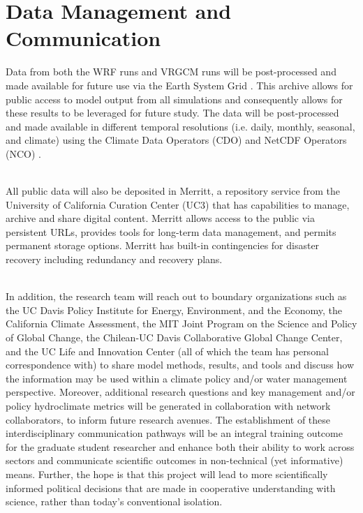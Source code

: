 \documentclass[11pt]{article}
\begin{document}
\setcounter{section}{1}

\section{Data Management and Communication}

Data from both the WRF runs and VRGCM runs will be post-processed and made available for future use via the Earth System Grid \citep{williams2009earth}. This archive allows for public access to model output from all simulations and consequently allows for these results to be leveraged for future study.  The data will be post-processed and made available in different temporal resolutions (i.e. daily, monthly, seasonal, and climate) using the Climate Data Operators (CDO) and NetCDF Operators (NCO) \citep{schulzweida2007cdo,zender2006netcdf}.

\ \\

\noindent All public data will also be deposited in Merritt, a repository service from the University of California Curation Center (UC3) that has capabilities to manage, archive and share digital content. Merritt allows access to the public via persistent URLs, provides tools for long-term data management, and permits permanent storage options. Merritt has built-in contingencies for disaster recovery including redundancy and recovery plans.

\ \\

\noindent In addition, the research team will reach out to boundary organizations such as the UC Davis Policy Institute for Energy, Environment, and the Economy, the California Climate Assessment, the MIT Joint Program on the Science and Policy of Global Change, the Chilean-UC Davis Collaborative Global Change Center, and the UC Life and Innovation Center (all of which the team has personal correspondence with) to share model methods, results, and tools and discuss how the information may be used within a climate policy and/or water management perspective.  Moreover, additional research questions and key management and/or policy hydroclimate metrics will be generated in collaboration with network collaborators, to inform future research avenues.  The establishment of these interdisciplinary communication pathways will be an integral training outcome for the graduate student researcher and enhance both their ability to work across sectors and communicate scientific outcomes in non-technical (yet informative) means.  Further, the hope is that this project will lead to more scientifically informed political decisions that are made in cooperative understanding with science, rather than today's conventional isolation.  

  
\end{document}
